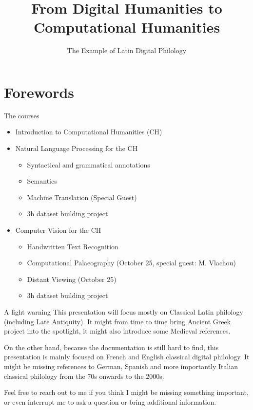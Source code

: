 \documentclass[aspectratio=169]{beamer}
\title[Intro to CH]{From Digital Humanities to Computational Humanities}
\subtitle{The Example of Latin Digital Philology}
\begin{document}
\frame{\titlepage}


\section{Forewords}

\begin{frame}{The courses}
    \begin{itemize}
        \item Introduction to Computational Humanities (CH)
        \item Natural Language Processing for the CH
        \begin{itemize}
            \item Syntactical and grammatical annotations
            \item Semantics
            \item Machine Translation (Special Guest)
            \item 3h dataset building project
        \end{itemize}
        \item Computer Vision for the CH
        \begin{itemize}
            \item Handwritten Text Recognition
            \item Computational Palaeography (October 25, special guest: M. Vlachou)
            \item Distant Viewing (October 25)
            \item 3h dataset building project
        \end{itemize}
    \end{itemize}
\end{frame}

\begin{frame}{A light warning}
    This presentation will focus mostly on Classical Latin philology (including Late Antiquity). It might from time to time bring Ancient Greek project into the spotlight, it might also introduce some Medieval references.

    On the other hand, because the documentation is still hard to find, this presentation is mainly focused on French and English classical digital philology. It might be missing references to German, Spanish and more importantly Italian classical philology from the 70s onwards to the 2000s. 
    
    Feel free to reach out to me if you think I might be missing something important, or even interrupt me to ask a question or bring additional information.
\end{frame}
\end{document}
